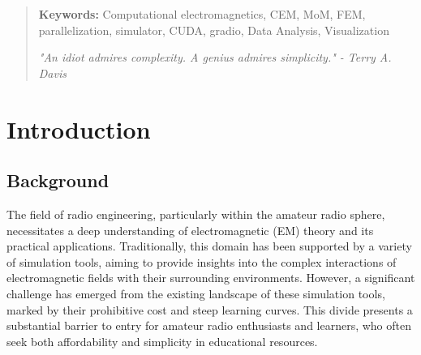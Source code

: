 \documentclass[11pt, a4paper, titlepage]{article}
\begin{document}
\begin{abstract}
	
	
	\begin{flushleft}
		{\small {\bf Keywords:} Computational electromagnetics, CEM, MoM, FEM, parallelization, simulator, CUDA, gradio, Data Analysis, Visualization}
	\end{flushleft}
	\hspace*{\textheight}
	\begin{flushright}
		\it{"An idiot admires complexity. A genius admires simplicity." - Terry A. Davis}
	\end{flushright}
	
	
\end{abstract}
\setcounter{page}{2}
\tableofcontents
\newpage
\section{Introduction}
\subsection{Background}
The field of radio engineering, particularly within the amateur radio sphere, necessitates a deep understanding of electromagnetic (EM) theory and its practical applications. Traditionally, this domain has been supported by a variety of simulation tools, aiming to provide insights into the complex interactions of electromagnetic fields with their surrounding environments. However, a significant challenge has emerged from the existing landscape of these simulation tools, marked by their prohibitive cost and steep learning curves. This divide presents a substantial barrier to entry for amateur radio enthusiasts and learners, who often seek both affordability and simplicity in educational resources. 
\end{document}

